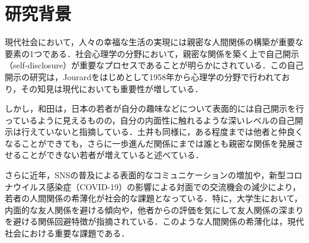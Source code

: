 \section{研究背景}\label{背景}

現代社会において，人々の幸福な生活の実現には親密な人間関係の構築が重要な要素の1つである．社会心理学の分野において，親密な関係を築く上で自己開示（self-disclosure）が重要なプロセスであることが明らかにされている\cite{collins_1994}．この自己開示の研究は，Jourardをはじめとして1958年から心理学の分野で行われており，その知見は現代においても重要性が増している．

しかし，和田\cite{和田実_1990_青年の対人関係の変容}は，日本の若者が自分の趣味などについて表面的には自己開示を行っているように見えるものの，自分の内面性に触れるような深いレベルの自己開示は行えていないと指摘している．土井\cite{土井隆義_2004_個性}も同様に，ある程度までは他者と仲良くなることができても，さらに一歩進んだ関係にまでは誰とも親密な関係を発展させることができない若者が増えていると述べている．

さらに近年，SNSの普及による表面的なコミュニケーションの増加や，新型コロナウイルス感染症（COVID-19）の影響による対面での交流機会の減少により，若者の人間関係の希薄化が社会的な課題となっている．特に，大学生において，内面的な友人関係を避ける傾向\cite{岡田努_2007}や，他者からの評価を気にして友人関係の深まりを避ける関係回避特徴が指摘されている\cite{岡田努_2010_青年期の友人関係と自己}．このような人間関係の希薄化は，現代社会における重要な課題である．


